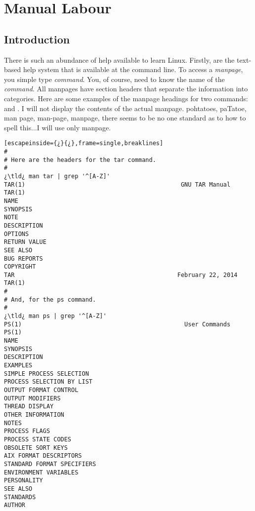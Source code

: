 \chapter{Manual Labour}
\pagestyle{fancy}
\label{ch:manual}
\fancyhf{} %
\fancyhead[OC]{\leftmark} %
\setlength{\headheight}{13.6pt} 
\cfoot{\thepage} %


		
\section{Introduction}
There is such an abundance of help available to learn Linux. Firstly,   are the text-based help system that is available at the command line.  To access a \emph{manpage}, you simple type  \emph{command}. You, of course, need to know the name of the \emph{command}. All manpages have section headers that separate the information into categories. Here are some examples of the manpage headings for two commands:  and . I will not display the contents of the actual manpage. pohtatoes, paTatoe, man page, man-page, manpage, there seems to be no one standard as to how to spell this...I will use only manpage.

\begin{lstlisting}[escapeinside={¿}{¿},frame=single,breaklines]
#
# Here are the headers for the tar command.
#
¿\tld¿ man tar | grep '^[A-Z]'
TAR(1)                                            GNU TAR Manual                                            TAR(1)
NAME
SYNOPSIS
NOTE
DESCRIPTION
OPTIONS
RETURN VALUE
SEE ALSO
BUG REPORTS
COPYRIGHT
TAR                                              February 22, 2014                                          TAR(1)
#
# And, for the ps command.
#
¿\tld¿ man ps | grep '^[A-Z]'
PS(1)                                              User Commands                                             PS(1)
NAME
SYNOPSIS
DESCRIPTION
EXAMPLES
SIMPLE PROCESS SELECTION
PROCESS SELECTION BY LIST
OUTPUT FORMAT CONTROL
OUTPUT MODIFIERS
THREAD DISPLAY
OTHER INFORMATION
NOTES
PROCESS FLAGS
PROCESS STATE CODES
OBSOLETE SORT KEYS
AIX FORMAT DESCRIPTORS
STANDARD FORMAT SPECIFIERS
ENVIRONMENT VARIABLES
PERSONALITY
SEE ALSO
STANDARDS
AUTHOR
\end{lstlisting}


